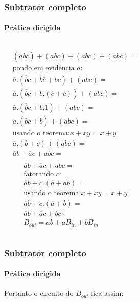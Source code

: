 \begin{frame}
	\frametitle{Subtrator completo}
	\framesubtitle{\textbf{Prática dirigida}}
	\begin{columns}
		\begin{equation}
			\begin{aligned}
			&(\overline{a}\overline{b}c)+(\overline{a}b\overline{c})+(\overline{a}bc)+(abc) = \\
			&\text{pondo em evidência } \overline{a}: \\
			&\overline{a}.(\overline{b}c+b\overline{c}+bc)+(abc) =\\
			&\overline{a}.(\overline{b}c+ b.(\overline{c}+c))+(abc) =\\
			&\overline{a}.(\overline{b}c+ b.1)+(abc) =\\
			&\overline{a}.(\overline{b}c+ b)+(abc) =\\
			&\text{usando o teorema:} x+\overline{x}y = x+y \\
			&\overline{a}.(b+c)+(abc) =\\
			&\overline{a}b+\overline{a}c+abc =\\
			\end{aligned}
		\end{equation}
		\begin{equation}
			\begin{aligned}
				&\overline{a}b+\overline{a}c+abc =\\
				&\text{fatorando } c: \\
				&\overline{a}b+c.(\overline{a}+ab) = \\
				&\text{usando o teorema:} x+\overline{x}y = x+y \\
				&\overline{a}b+c.(\overline{a}+b) = \\
				&\overline{a}b+\overline{a}c+bc \therefore \\
				&\boxed{B_{out}=\overline{a}b+\overline{a}B_{in}+bB_{in}}
			\end{aligned}
		\end{equation}
	\end{columns}
\end{frame}

\begin{frame}
	\frametitle{Subtrator completo}
	\framesubtitle{\textbf{Prática dirigida}}
	\par Portanto o circuito do $B_{out}$ fica assim:
	\begin{figure}
		\centering
		
		\label{fig:subtratorcompletoparte02}
	\end{figure}
\end{frame}

